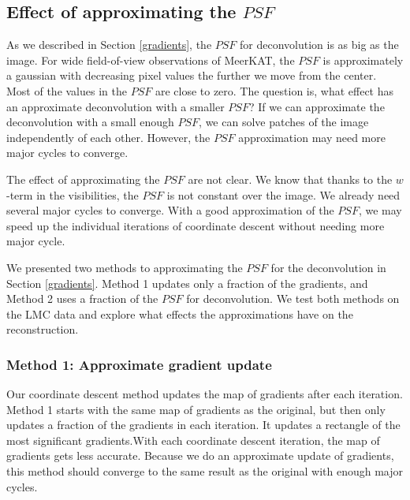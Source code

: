 \subsection{Effect of approximating the $PSF$} \label{results:gradients}
As we described in Section \ref{gradients}, the $PSF$ for deconvolution is as big as the image. For wide field-of-view observations of MeerKAT, the $PSF$ is approximately a gaussian with decreasing pixel values the further we move from the center. Most of the values in the $PSF$ are close to zero. The question is, what effect has an approximate deconvolution with a smaller $PSF$? If we can approximate the deconvolution with a small enough $PSF$, we can solve patches of the image independently of each other. However, the $PSF$ approximation may need more major cycles to converge.







The effect of approximating the $PSF$ are not clear. We know that thanks to the $w$-term in the visibilities, the $PSF$ is not constant over the image. We already need several major cycles to converge. With a good approximation of the $PSF$, we may speed up the individual iterations of coordinate descent without needing more major cycle.

We presented two methods to approximating the $PSF$ for the deconvolution in Section \ref{gradients}. Method 1 updates only a fraction of the gradients, and Method 2 uses a fraction of the $PSF$ for deconvolution. We test both methods on the LMC data and explore what effects the approximations have on the reconstruction.





\subsubsection{Method 1: Approximate gradient update}
Our coordinate descent method updates the map of gradients after each iteration.  Method 1 starts with the same map of gradients as the original, but then only updates a fraction of the gradients in each iteration. It updates a rectangle of the most significant gradients.With each coordinate descent iteration, the map of gradients gets less accurate. Because we do an approximate update of gradients, this method should converge to the same result as the original with enough major cycles.

